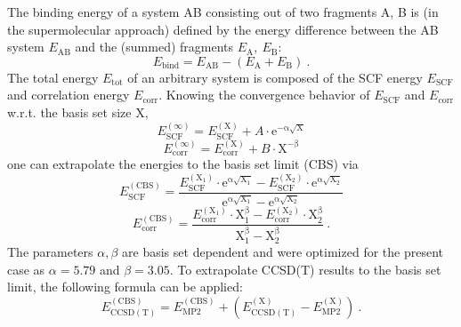 \documentclass[a4paper,12pt]{scrartcl}
\begin{document}
The binding energy of a system AB consisting out of two fragments A, B is (in the supermolecular approach) defined by the energy difference between the AB system $ E_\mathrm{AB} $ and the (summed) fragments $ E_\mathrm{A},~E_\mathrm{B} $:
%
\begin{equation}
	E_\mathrm{bind} = E_\mathrm{AB} - ( E_\mathrm{A} + E_\mathrm{B} )~.
\end{equation}
%
The total energy $ E_\mathrm{tot} $ of an arbitrary system is composed of the SCF energy $ E_\mathrm{SCF} $ and correlation energy $ E_\mathrm{corr} $. Knowing the convergence behavior of $ E_\mathrm{SCF} $ and $ E_\mathrm{corr} $ w.r.t. the basis set size X,
%
\begin{equation}
	E_\mathrm{SCF}^{(\infty)} = E_\mathrm{SCF}^{(\mathrm{X})} + A \cdot \mathrm{e^{-\alpha\sqrt{X}}}
\end{equation}
%
\begin{equation}
	E_\mathrm{corr}^{(\infty)} = E_\mathrm{corr}^{(\mathrm{X})}+ B \cdot \mathrm{X^{-\beta}}
\end{equation}
%
one can extrapolate the energies to the basis set limit (CBS) via
%
\begin{equation}
	E_\mathrm{SCF}^{(\mathrm{CBS})} = \frac{E_\mathrm{SCF}^{(\mathrm{X_1})} \cdot \mathrm{e^{\alpha\sqrt{X_1}}} - E_\mathrm{SCF}^{(\mathrm{X_2})} \cdot \mathrm{e^{\alpha\sqrt{X_2}}}}{\mathrm{e^{\alpha\sqrt{X_1}}} - \mathrm{e^{\alpha\sqrt{X_2}}}}
\end{equation}
%
\begin{equation}
	E_\mathrm{corr}^{(\mathrm{CBS})} = \frac{E_\mathrm{corr}^{(\mathrm{X_1})} \cdot \mathrm{X^{\beta}_1} - E_\mathrm{corr}^{(\mathrm{X_2})} \cdot \mathrm{X^{\beta}_2}}{\mathrm{X^{\beta}_1} - \mathrm{X^{\beta}_2}}~.
\end{equation}
%
The parameters $ \alpha,\beta $ are basis set dependent and were optimized for the present case as $ \alpha = 5.79 $ and $ \beta = 3.05 $. To extrapolate CCSD(T) results to the basis set limit, the following formula can be applied:
%
\begin{equation}
	E_\mathrm{CCSD(T)}^\mathrm{(CBS)} = E_\mathrm{MP2}^\mathrm{(CBS)} + ( E_\mathrm{CCSD(T)}^\mathrm{(X)} - E_\mathrm{MP2}^\mathrm{(X)})~.
\end{equation}
%
\end{document}
